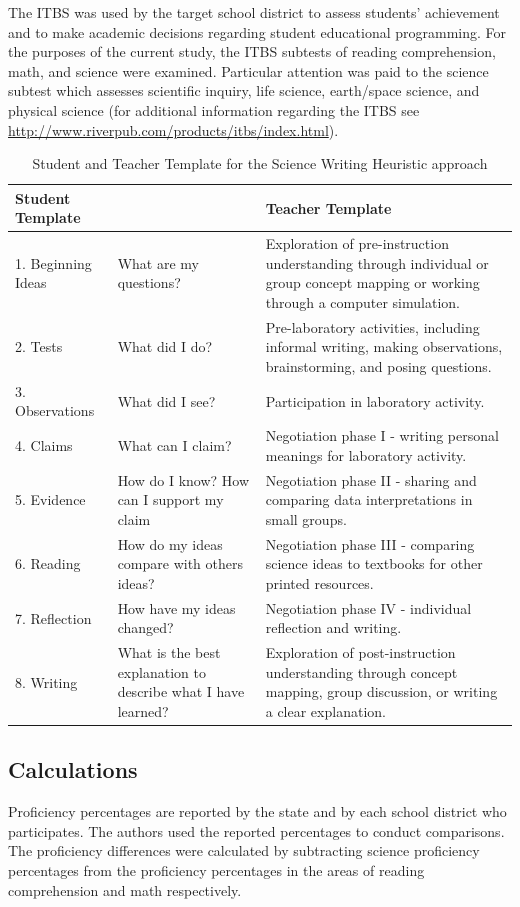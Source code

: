 \documentclass[11.5pt]{sig-alternate} %
\begin{document}
\begin{large}
The ITBS was used by the target school district to assess students’ achievement and to make academic decisions regarding student educational programming. For the purposes of the current study, the ITBS subtests of reading comprehension, math, and science were examined. Particular attention was paid to the science subtest which assesses scientific inquiry, life science, earth/space science, and physical science (for additional information regarding the ITBS see \url{http://www.riverpub.com/products/itbs/index.html}).

\begin{table}[thp]
\caption{Student and Teacher Template for the Science Writing Heuristic approach}
\begin{tabular}{lll}
\hline
\textbf{Student Template} & & \textbf{Teacher Template} \\ \hline
1. Beginning Ideas & What are my questions? & Exploration of pre-instruction understanding through individual or group concept mapping or working through a computer simulation. \\ \hline
2. Tests & What did I do? & Pre-laboratory activities, including informal writing, making observations, brainstorming, and posing questions. \\ \hline
3. Observations & What did I see? & Participation in laboratory activity. \\ \hline
4. Claims & What can I claim? & Negotiation phase I - writing personal meanings for laboratory activity. \\ \hline
5. Evidence & How do I know? How can I support my claim & Negotiation phase II - sharing and comparing data interpretations in small groups. \\ \hline
6. Reading & How do my ideas compare with others ideas? & Negotiation phase III - comparing science ideas to textbooks for other printed resources. \\ \hline
7. Reflection & How have my ideas changed? & Negotiation phase IV - individual reflection and writing. \\ \hline
8. Writing & What is the best explanation to describe what I have learned? & Exploration of post-instruction understanding through concept mapping, group discussion, or writing a clear explanation. \\ \hline
\end{tabular}
\end{table}

\subsection*{Calculations}
Proficiency percentages are reported by the state and by each school district who participates. The authors used the reported percentages to conduct comparisons. The proficiency differences were calculated by subtracting science proficiency percentages from the proficiency percentages in the areas of reading comprehension and math respectively.


\end{large}
\end{document}
